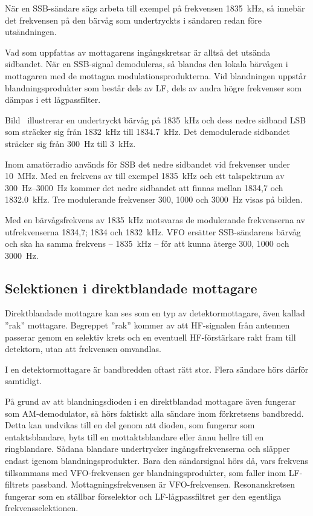 När en SSB-sändare sägs arbeta till exempel på frekvensen
\qty{1835}{\kilo\hertz}, så innebär det frekvensen på den bärvåg som
undertryckts i sändaren redan före utsändningen.

Vad som uppfattas av mottagarens ingångskretsar är alltså det utsända sidbandet.
När en SSB-signal demoduleras, så blandas den lokala bärvågen i mottagaren med
de mottagna modulationsprodukterna.
Vid blandningen uppstår blandningsprodukter som består dels av LF, dels av
andra högre frekvenser som dämpas i ett lågpassfilter.

Bild~ illustrerar en undertryckt bärvåg på
\qty{1835}{\kilo\hertz} och dess nedre sidband LSB som sträcker sig från
\qty{1832}{\kilo\hertz} till \qty{1834,7}{\kilo\hertz}.
Det demodulerade sidbandet sträcker sig från \qty{300}{\hertz} till
\qty{3}{\kilo\hertz}.

Inom amatörradio används för SSB det nedre sidbandet vid frekvenser under
\qty{10}{\mega\hertz}.
Med en frekvens av till exempel \qty{1835}{\kilo\hertz} och ett talspektrum av
\SIrange{300}{3000}{\hertz} kommer det nedre sidbandet att finnas mellan 1834,7
och \qty{1832,0}{\kilo\hertz}.
Tre modulerande frekvenser 300, 1000 och \qty{3000}{\hertz} visas på bilden.

Med en bärvågsfrekvens av \qty{1835}{\kilo\hertz} motsvaras de modulerande
frekvenserna av utfrekvenserna 1834,7; 1834 och \qty{1832}{\kilo\hertz}.
VFO ersätter SSB-sändarens bärvåg och ska ha samma frekvens --
\qty{1835}{\kilo\hertz} -- för att kunna återge 300, 1000 och \qty{3000}{\hertz}.

\newpage
\subsection{Selektionen i direktblandade mottagare}
\label{selektion_direktblandade}

Direktblandade mottagare kan ses som en typ av detektormottagare, även
kallad ''rak'' mottagare.
Begreppet ''rak'' kommer av att HF-signalen från antennen passerar genom en
selektiv krets och en eventuell HF-förstärkare rakt fram till detektorn,
utan att frekvensen omvandlas.

I en detektormottagare är bandbredden oftast rätt stor.
Flera sändare hörs därför samtidigt.

På grund av att blandningsdioden i en direktblandad mottagare även fungerar
som AM-demodulator, så hörs faktiskt alla sändare inom förkretsens bandbredd.
Detta kan undvikas till en del genom att dioden, som fungerar som
entaktsblandare, byts till en mottaktsblandare eller ännu hellre till en
ringblandare.
Sådana blandare undertrycker ingångsfrekvenserna och släpper endast igenom
blandningsprodukter.
Bara den sändarsignal hörs då, vars frekvens tillsammans med VFO-frekvensen
ger blandningsprodukter, som faller inom LF-filtrets passband.
Mottagningsfrekvensen är VFO-frekvensen.
Resonanskretsen fungerar som en ställbar förselektor och LF-lågpassfiltret
ger den egentliga frekvensselektionen.


